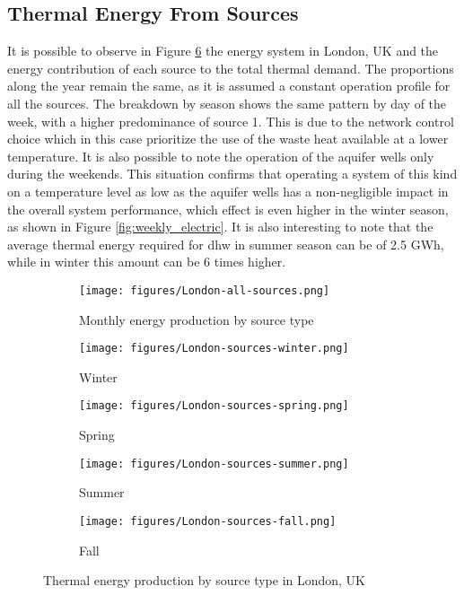 \documentclass{article}
\begin{document}
\subsection{Thermal Energy From Sources}
It is possible to observe in Figure \ref{fig:London_sources} the energy system in London, UK and the energy contribution of each source to the total thermal demand. The proportions along the year remain the same, as it is assumed a constant operation profile for all the sources. The breakdown by season shows the same pattern by day of the week, with a higher predominance of source 1. This is due to the network control choice which in this case prioritize the use of the waste heat available at a lower temperature. It is also possible to note the operation of the aquifer wells only during the weekends. This situation confirms that operating a system of this kind on a temperature level as low as the aquifer wells has a non-negligible impact in the overall system performance, which effect is even higher in the winter season, as shown in Figure \ref{fig:weekly_electric}.
It is also interesting to note that the average thermal energy required for \gls{dhw} in summer season can be of 2.5 GWh, while in winter this amount can be 6 times higher.

\begin{figure}[H]
\begin{subfigure}{\textwidth}
\texttt{[image: figures/London-all-sources.png]}
\caption{Monthly energy production by source type}
\label{fig:heat_signature_all}
\end{subfigure}

\begin{subfigure}{0.5\textwidth}
\texttt{[image: figures/London-sources-winter.png]}
\caption{Winter}
\label{fig:winter_season}
\end{subfigure}
\begin{subfigure}{0.5\textwidth}
\texttt{[image: figures/London-sources-spring.png]}
\caption{Spring}
\label{fig:spring_season}
\end{subfigure}

\begin{subfigure}{0.5\textwidth}
\texttt{[image: figures/London-sources-summer.png]}
\caption{Summer}
\label{fig:summer_season}
\end{subfigure}
\begin{subfigure}{0.5\textwidth}
\texttt{[image: figures/London-sources-fall.png]}
\caption{Fall}
\label{fig:fall_season}
\end{subfigure}

\caption{Thermal energy production by source type in London, UK}
\label{fig:London_sources}
\end{figure}
\end{document}
